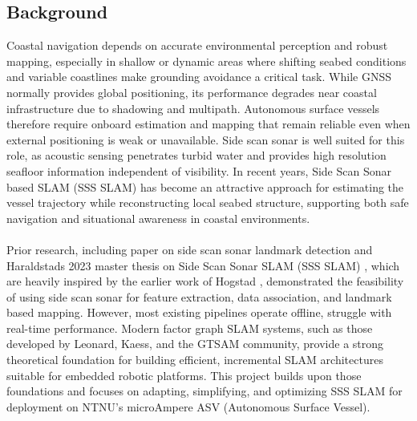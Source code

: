 \subsection{Background}
Coastal navigation depends on accurate environmental perception and robust mapping, especially in shallow or dynamic areas where shifting seabed conditions and variable coastlines make grounding avoidance a critical task. While GNSS normally provides global positioning, its performance degrades near coastal infrastructure due to shadowing and multipath. Autonomous surface vessels therefore require onboard estimation and mapping that remain reliable even when external positioning is weak or unavailable. Side scan sonar is well suited for this role, as acoustic sensing penetrates turbid water and provides high resolution seafloor information independent of visibility. In recent years, Side Scan Sonar based SLAM (SSS SLAM) has become an attractive approach for estimating the vessel trajectory while reconstructing local seabed structure, supporting both safe navigation and situational awareness in coastal environments.
\\ \\
Prior research, including paper on side scan sonar landmark detection \cite{side_scan_sonar_paper} and Haraldstads 2023 master thesis on Side Scan Sonar SLAM (SSS SLAM) \cite{side_scan_sonar_master_thesis}, which are heavily inspired by the earlier work of Hogstad \cite{side_scan_sonar_master_thesis_old}, demonstrated the feasibility of using side scan sonar for feature extraction, data association, and landmark based mapping. However, most existing pipelines operate offline, struggle with real-time performance. Modern factor graph SLAM systems, such as those developed by Leonard, Kaess, and the GTSAM community, provide a strong theoretical foundation for building efficient, incremental SLAM architectures suitable for embedded robotic platforms. This project builds upon those foundations and focuses on adapting, simplifying, and optimizing SSS SLAM for deployment on NTNU's microAmpere ASV (Autonomous Surface Vessel).
